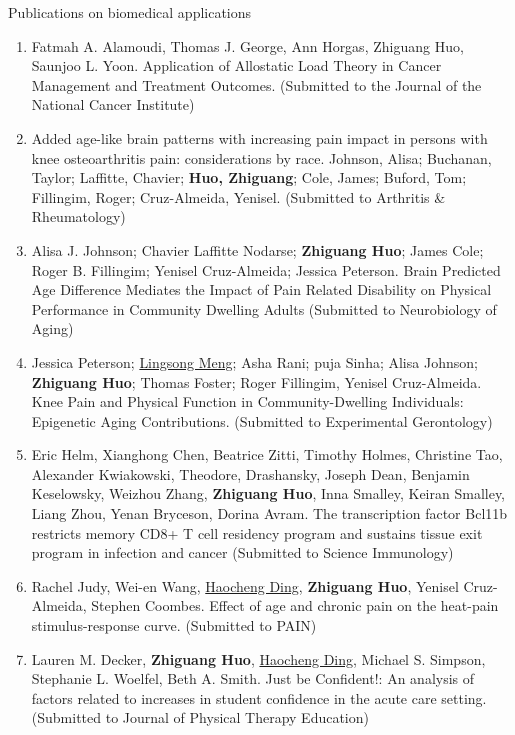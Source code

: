 \documentclass{resume} %
\begin{document}
\begin{rSection}{Publications on biomedical applications}
\begin{enumerate}[noitemsep,topsep=0pt]
\item
Fatmah A. Alamoudi, Thomas J. George, Ann Horgas, Zhiguang Huo, Saunjoo L. Yoon.  
Application of Allostatic Load Theory in Cancer Management and Treatment Outcomes.
(Submitted to the Journal of the National Cancer Institute)

\item
Added age-like brain patterns with increasing pain impact in persons with knee osteoarthritis pain: considerations by race. 
Johnson, Alisa; Buchanan, Taylor; Laffitte, Chavier; {\bf Huo, Zhiguang}; Cole, James; Buford, Tom; Fillingim, Roger; Cruz-Almeida, Yenisel. 
(Submitted to Arthritis \& Rheumatology)



 \item
Alisa J. Johnson; Chavier Laffitte Nodarse; {\bf Zhiguang Huo}; James Cole; Roger B. Fillingim; Yenisel Cruz-Almeida;  Jessica Peterson.
Brain Predicted Age Difference Mediates the Impact of Pain Related Disability on Physical Performance in Community Dwelling Adults
(Submitted to Neurobiology of Aging)

\item
Jessica Peterson; \underline{Lingsong Meng}; Asha Rani; puja Sinha; Alisa Johnson; {\bf Zhiguang Huo}; Thomas Foster; Roger Fillingim, Yenisel Cruz-Almeida. 
Knee Pain and Physical Function in Community-Dwelling Individuals: Epigenetic Aging Contributions.
(Submitted to Experimental Gerontology)

\item
Eric Helm, Xianghong Chen, Beatrice Zitti, Timothy Holmes, Christine Tao, Alexander Kwiakowski, Theodore, Drashansky, Joseph Dean, Benjamin Keselowsky, Weizhou Zhang,  {\bf Zhiguang Huo}, Inna Smalley, Keiran Smalley, Liang Zhou, Yenan Bryceson, Dorina Avram.
The transcription factor Bcl11b restricts memory CD8+ T cell residency program and sustains tissue exit program in infection and cancer
(Submitted to Science Immunology)

\item
Rachel Judy, Wei-en Wang, \underline{Haocheng Ding}, {\bf Zhiguang Huo}, Yenisel Cruz-Almeida, Stephen Coombes.
Effect of age and chronic pain on the heat-pain stimulus-response curve.
(Submitted to PAIN)

\item
Lauren M. Decker, {\bf Zhiguang Huo}, \underline{Haocheng Ding}, Michael S. Simpson, Stephanie L. Woelfel, Beth A. Smith.
Just be Confident!: An analysis of factors related to increases in student confidence in the acute care setting.
(Submitted to Journal of Physical Therapy Education)


\end{enumerate}
\end{rSection}
\end{document}
